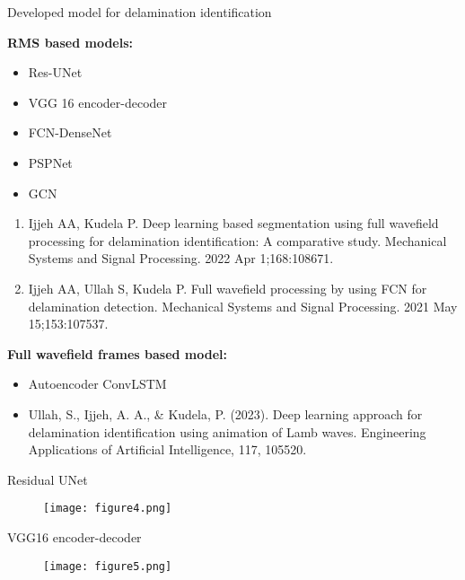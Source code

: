 \documentclass[10pt,aspectratio=169]{beamer} %
\begin{document}
\begin{frame}{Developed model for delamination identification}
	\begin{minipage}[t]{0.45\textwidth}
		\textbf{RMS based models: \\}
			\begin{itemize}
				\item Res-UNet
				\item VGG 16 encoder-decoder
				\item FCN-DenseNet
				\item PSPNet
				\item GCN
			\end{itemize}
		{\tiny 
			\begin{enumerate}
				\item Ijjeh AA, Kudela P. Deep learning based segmentation using full wavefield processing for delamination identification: A comparative study. Mechanical Systems and Signal Processing. 2022 Apr 1;168:108671.
				\item Ijjeh AA, Ullah S, Kudela P. Full wavefield processing by using FCN for delamination detection. Mechanical Systems and Signal Processing. 2021 May 15;153:107537.
				
			\end{enumerate}}
	\end{minipage}
	\hfill
	\begin{minipage}[t]{.45\textwidth}
	\textbf{Full wavefield frames based model:}
		\begin{itemize}
			\item Autoencoder ConvLSTM
		\end{itemize}
	\tiny
	\begin{itemize}
		\item Ullah, S., Ijjeh, A. A., \& Kudela, P. (2023). Deep learning approach for delamination identification using animation of Lamb waves. Engineering Applications of Artificial Intelligence, 117, 105520.
	\end{itemize}
	
	\end{minipage}
\end{frame}

\begin{frame}{Residual UNet}
	\begin{figure}
		\centering
		\texttt{[image: figure4.png]}
	\end{figure}
\end{frame}

\begin{frame}{VGG16 encoder-decoder}
	\begin{figure}
		\centering
		\texttt{[image: figure5.png]}
	\end{figure}
\end{frame}
\end{document}
